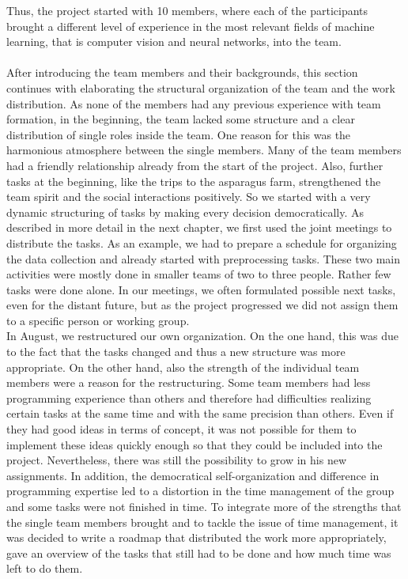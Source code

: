 Thus, the project started with 10 members, where each of the participants brought a different level of experience in the most relevant fields of machine learning, that is computer vision and neural networks, into the team. \\
\\
After introducing the team members and their backgrounds, this section continues with elaborating the structural organization of the team and the work distribution.
As none of the members had any previous experience with team formation, in the beginning, the team lacked some structure and a clear distribution of single roles inside the team. One reason for this was the harmonious atmosphere between the single members. Many of the team members had a friendly relationship already from the start of the project. Also, further tasks at the beginning, like the trips to the asparagus farm, strengthened the team spirit and the social interactions positively. So we started with a very dynamic structuring of tasks by making every decision democratically. As described in more detail in the next chapter, we first used the joint meetings to distribute the tasks. As an example, we had to prepare a schedule for organizing the data collection and already started with preprocessing tasks. These two main activities were mostly done in smaller teams of two to three people. Rather few tasks were done alone. In our meetings, we often formulated possible next tasks, even for the distant future, but as the project progressed we did not assign them to a specific person or working group. \\
In August, we restructured our own organization. On the one hand, this was due to the fact that the tasks changed and thus a new structure was more appropriate. On the other hand, also the strength of the individual team members were a reason for the restructuring. Some team members had less programming experience than others and therefore had difficulties realizing certain tasks at the same time and with the same precision than others. Even if they had good ideas in terms of concept, it was not possible for them to implement these ideas quickly enough so that they could be included into the project. Nevertheless, there was still the possibility to grow in his new assignments. In addition, the democratical self-organization and difference in programming expertise led to a distortion in the time management of the group and some tasks were not finished in time. To integrate more of the strengths that the single team members brought and to tackle the issue of time management, it was decided to write a roadmap that distributed the work more appropriately, gave an overview of the tasks that still had to be done and how much time was left to do them. \\
